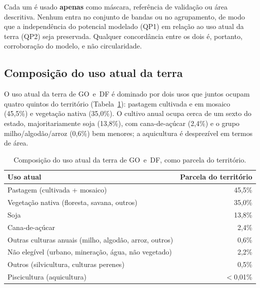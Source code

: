 Cada um é usado \textbf{apenas} como máscara, referência de validação ou área descritiva.
Nenhum entra no conjunto de bandas ou no agrupamento, de modo que a independência do potencial
modelado (QP1) em relação ao uso atual da terra (QP2) seja preservada. Qualquer
concordância entre os dois é, portanto, corroboração do modelo, e não circularidade.

\subsection{Composição do uso atual da terra}\label{sec:realized-composition}


O uso atual da terra de GO~e~DF é dominado por dois usos que juntos ocupam quatro quintos do
território (Tabela~\ref{tab:realized-composition}): pastagem cultivada e em mosaico (45,5\%) e
vegetação nativa (35,0\%). O cultivo anual ocupa cerca de um sexto do estado, majoritariamente
soja (13,8\%), com cana-de-açúcar (2,4\%) e o grupo milho/algodão/arroz (0,6\%) bem menores; a
aquicultura é desprezível em termos de área.

\begin{table}[H]
\centering
\caption{Composição do uso atual da terra de GO~e~DF, como parcela do território.}
\label{tab:realized-composition}
\begin{tabular}{@{}lr@{}}
\toprule
Uso atual                                                         & Parcela do território \\
\midrule
Pastagem (cultivada + mosaico)                                    & 45,5\% \\
Vegetação nativa (floresta, savana, outros)                       & 35,0\% \\
Soja                                                              & 13,8\% \\
Cana-de-açúcar                                                    & 2,4\% \\
Outras culturas anuais (milho, algodão, arroz, outros)            & 0,6\% \\
Não elegível (urbano, mineração, água, não vegetado)              & 2,2\% \\
Outros (silvicultura, culturas perenes)                           & 0,5\% \\
Piscicultura (aquicultura)                                        & $<$0,01\% \\
\bottomrule
\end{tabular}
\end{table}

